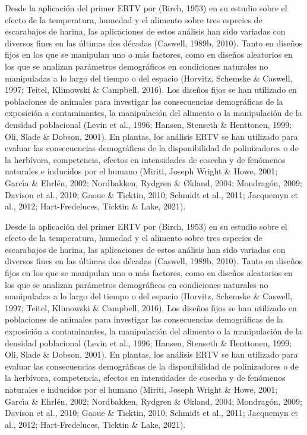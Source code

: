 \documentclass[
  12pt,
  letterpaper,
]{book}
\begin{document}
Desde la aplicación del primer ERTV por (Birch, 1953) en su estudio
sobre el efecto de la temperatura, humedad y el alimento sobre tres
especies de escarabajos de harina, las aplicaciones de estos análisis
han sido variadas con diversos fines en las últimas dos décadas
(Caswell, 1989b, 2010). Tanto en diseños fijos en los que se manipulan
uno o más factores, como en diseños aleatorios en los que se analizan
parámetros demográficos en condiciones naturales no manipuladas a lo
largo del tiempo o del espacio (Horvitz, Schemske \& Caswell, 1997;
Teitel, Klimowski \& Campbell, 2016). Los diseños fijos se han utilizado
en poblaciones de animales para investigar las consecuencias
demográficas de la exposición a contaminantes, la manipulación del
alimento o la manipulación de la densidad poblacional (Levin et al.,
1996; Hansen, Stenseth \& Henttonen, 1999; Oli, Slade \& Dobson, 2001).
En plantas, los análisis ERTV se han utilizado para evaluar las
consecuencias demográficas de la disponibilidad de polinizadores o de la
herbívora, competencia, efectos en intensidades de cosecha y de
fenómenos naturales e inducidos por el humano (Miriti, Joseph Wright \&
Howe, 2001; Garcı́a \& Ehrlén, 2002; Nordbakken, Rydgren \& Økland, 2004;
Mondragón, 2009; Davison et al., 2010; Gaoue \& Ticktin, 2010; Schmidt
et al., 2011; Jacquemyn et al., 2012; Hart-Fredeluces, Ticktin \& Lake,
2021).

Desde la aplicación del primer ERTV por (Birch, 1953) en su estudio
sobre el efecto de la temperatura, humedad y el alimento sobre tres
especies de escarabajos de harina, las aplicaciones de estos análisis
han sido variadas con diversos fines en las últimas dos décadas
(Caswell, 1989b, 2010). Tanto en diseños fijos en los que se manipulan
uno o más factores, como en diseños aleatorios en los que se analizan
parámetros demográficos en condiciones naturales no manipuladas a lo
largo del tiempo o del espacio (Horvitz, Schemske \& Caswell, 1997;
Teitel, Klimowski \& Campbell, 2016). Los diseños fijos se han utilizado
en poblaciones de animales para investigar las consecuencias
demográficas de la exposición a contaminantes, la manipulación del
alimento o la manipulación de la densidad poblacional (Levin et al.,
1996; Hansen, Stenseth \& Henttonen, 1999; Oli, Slade \& Dobson, 2001).
En plantas, los análisis ERTV se han utilizado para evaluar las
consecuencias demográficas de la disponibilidad de polinizadores o de la
herbívora, competencia, efectos en intensidades de cosecha y de
fenómenos naturales e inducidos por el humano (Miriti, Joseph Wright \&
Howe, 2001; Garcı́a \& Ehrlén, 2002; Nordbakken, Rydgren \& Økland, 2004;
Mondragón, 2009; Davison et al., 2010; Gaoue \& Ticktin, 2010; Schmidt
et al., 2011; Jacquemyn et al., 2012; Hart-Fredeluces, Ticktin \& Lake,
2021).
\end{document}
